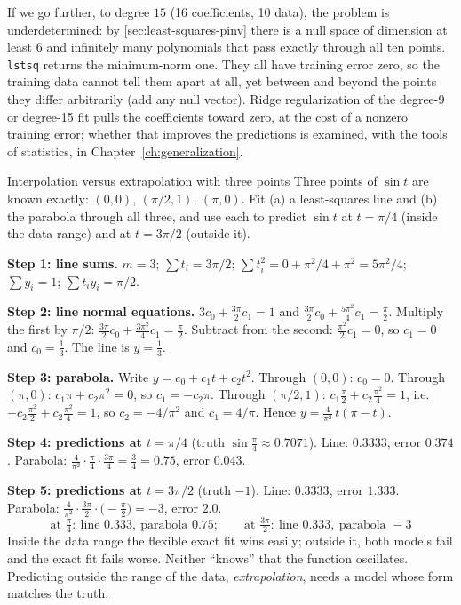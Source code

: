 If we go further, to degree $15$ (16 coefficients, 10 data), the problem is underdetermined: by \cref{sec:least-squares-pinv} there is a null space of dimension at least $6$ and infinitely many polynomials that pass exactly through all ten points. \texttt{lstsq} returns the minimum-norm one. They all have training error zero, so the training data cannot tell them apart at all, yet between and beyond the points they differ arbitrarily (add any null vector). Ridge regularization of the degree-9 or degree-15 fit pulls the coefficients toward zero, at the cost of a nonzero training error; whether that improves the predictions is examined, with the tools of statistics, in Chapter~\ref{ch:generalization}.

\begin{sample}{Interpolation versus extrapolation with three points}
Three points of $\sin t$ are known exactly: $(0,0)$, $(\pi/2,1)$, $(\pi,0)$. Fit (a) a least-squares line and (b) the parabola through all three, and use each to predict $\sin t$ at $t=\pi/4$ (inside the data range) and at $t = 3\pi/2$ (outside it).

\textbf{Step 1: line sums.} $m = 3$; $\sum t_i = 3\pi/2$; $\sum t_i^2 = 0 + \pi^2/4 + \pi^2 = 5\pi^2/4$; $\sum y_i = 1$; $\sum t_iy_i = \pi/2$.

\textbf{Step 2: line normal equations.} $3c_0 + \frac{3\pi}{2}c_1 = 1$ and $\frac{3\pi}{2}c_0 + \frac{5\pi^2}{4}c_1 = \frac\pi2$. Multiply the first by $\pi/2$: $\frac{3\pi}{2}c_0 + \frac{3\pi^2}{4}c_1 = \frac\pi2$. Subtract from the second: $\frac{\pi^2}{2}c_1 = 0$, so $c_1 = 0$ and $c_0 = \frac13$. The line is $y = \frac13$.

\textbf{Step 3: parabola.} Write $y = c_0 + c_1t + c_2t^2$. Through $(0,0)$: $c_0 = 0$. Through $(\pi,0)$: $c_1\pi + c_2\pi^2 = 0$, so $c_1 = -c_2\pi$. Through $(\pi/2,1)$: $c_1\frac\pi2 + c_2\frac{\pi^2}{4} = 1$, i.e.\ $-c_2\frac{\pi^2}{2}+c_2\frac{\pi^2}{4} = 1$, so $c_2 = -4/\pi^2$ and $c_1 = 4/\pi$. Hence $y = \frac{4}{\pi^2}\,t(\pi - t)$.

\textbf{Step 4: predictions at $t = \pi/4$} (truth $\sin\frac\pi4\approx0.7071$). Line: $0.3333$, error $0.374$. Parabola: $\frac{4}{\pi^2}\cdot\frac\pi4\cdot\frac{3\pi}{4} = \frac34 = 0.75$, error $0.043$.

\textbf{Step 5: predictions at $t = 3\pi/2$} (truth $-1$). Line: $0.3333$, error $1.333$. Parabola: $\frac{4}{\pi^2}\cdot\frac{3\pi}{2}\cdot\bigl(-\frac\pi2\bigr) = -3$, error $2.0$.
\[
\boxed{\,\text{at }\tfrac\pi4:\ \text{line }0.333,\ \text{parabola }0.75;\qquad \text{at }\tfrac{3\pi}2:\ \text{line }0.333,\ \text{parabola }-3\,}
\]
Inside the data range the flexible exact fit wins easily; outside it, both models fail and the exact fit fails worse. Neither ``knows'' that the function oscillates. Predicting outside the range of the data, \emph{extrapolation}, needs a model whose form matches the truth.
\end{sample}

